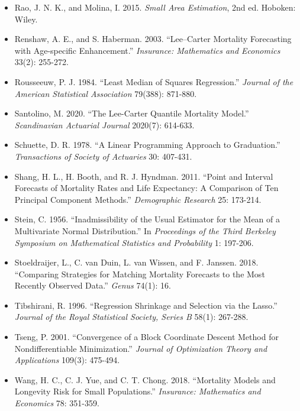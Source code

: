 \documentclass[UTF8, fontset=macnew, a4paper, 12pt]{ctexart}
\begin{document}
\begin{itemize}[leftmargin=2em, label={}, itemsep=3pt]
        the Lee--Carter Method: Adjusting for Smoothing and Lifespan
        Disparity.'' \textit{European Journal of Population} 37(1): 97-120.
  \item[] Rao, J. N. K., and Molina, I. 2015. \textit{Small Area Estimation}, 2nd ed.
        Hoboken: Wiley.
  \item[] Renshaw, A. E., and S. Haberman. 2003. ``Lee--Carter Mortality
        Forecasting with Age-specific Enhancement.''
        \textit{Insurance: Mathematics and Economics} 33(2): 255-272.
  \item[] Rousseeuw, P. J. 1984. ``Least Median of Squares Regression.''
        \textit{Journal of the American Statistical Association} 79(388): 871-880.
  \item[] Santolino, M. 2020. ``The Lee-Carter Quantile Mortality Model.''
        \textit{Scandinavian Actuarial Journal} 2020(7): 614-633.
  \item[] Schuette, D. R. 1978. ``A Linear Programming Approach to
        Graduation.'' \textit{Transactions of Society of Actuaries}
        30: 407-431.
  \item[] Shang, H. L., H. Booth, and R. J. Hyndman. 2011. ``Point and Interval
        Forecasts of Mortality Rates and Life Expectancy: A Comparison of Ten
        Principal Component Methods.''
        \textit{Demographic Research} 25: 173-214.
  \item[] Stein, C. 1956. ``Inadmissibility of the Usual Estimator for the Mean of a
        Multivariate Normal Distribution.'' In \textit{Proceedings of the Third
        Berkeley Symposium on Mathematical Statistics and Probability} 1: 197-206.
  \item[] Stoeldraijer, L., C. van Duin, L. van Wissen, and F. Janssen. 2018.
        ``Comparing Strategies for Matching Mortality Forecasts to the Most
        Recently Observed Data.'' \textit{Genus} 74(1): 16.
  \item[] Tibshirani, R. 1996. ``Regression Shrinkage and Selection via the
        Lasso.'' \textit{Journal of the Royal Statistical Society, Series B}
        58(1): 267-288.
  \item[] Tseng, P. 2001. ``Convergence of a Block Coordinate Descent Method
        for Nondifferentiable Minimization.'' \textit{Journal of Optimization
        Theory and Applications} 109(3): 475-494.
  \item[] Wang, H. C., C. J. Yue, and C. T. Chong. 2018. ``Mortality Models and
        Longevity Risk for Small Populations.''
        \textit{Insurance: Mathematics and Economics} 78: 351-359.

\end{itemize}
\end{document}
